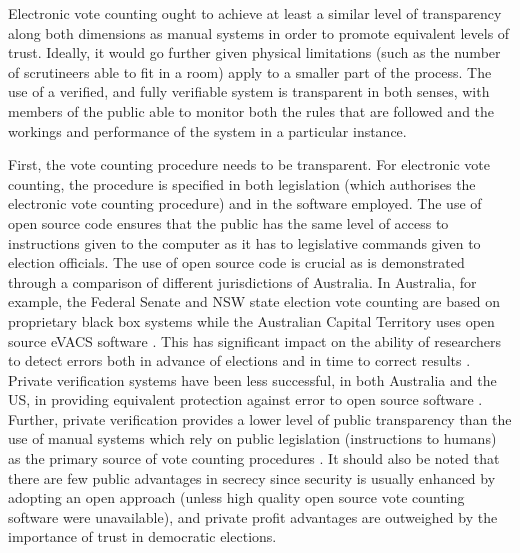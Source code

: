 Electronic vote counting ought to achieve at least a similar level
of transparency along both dimensions as manual systems in order to
promote equivalent levels of trust. Ideally, it would go further
given physical limitations (such as the number of scrutineers
able to fit in a room) apply to a smaller part of the process. The
use of a verified, and fully verifiable system is transparent in both senses, with members of
the public able to monitor both the rules that are followed
and the workings and performance of the system in a particular
instance. 

First, the vote counting procedure needs to be transparent. For
electronic vote counting, the procedure is specified in both
legislation (which authorises the electronic vote counting
procedure) and in the software employed. The use of open source code
ensures that the public has the same level of access to instructions
given to the computer as it has to legislative commands given to
election officials. The use of open source code is crucial as is
demonstrated through a comparison of different jurisdictions of
Australia. In Australia, for example, the Federal Senate and NSW
state election vote counting are based on proprietary black box
systems while the Australian Capital Territory uses open source
eVACS software
\cite{AEC:2013:LMM,Conway:2017:ANS,EA:2016:EVC}. This has
significant impact on the ability of researchers to detect errors
both in advance of elections and in time to correct results
\cite{Conway:2017:ANS}.
Private verification systems have been less successful, in both
Australia and the US, in providing equivalent protection against
error to open source software
\cite{Carrier:2012:VCT,Conway:2017:ANS}. Further, private
verification provides a lower level of public transparency than the
use of manual systems which rely on public legislation (instructions
to humans) as the primary source of vote counting procedures
\cite{Carrier:2012:VCT}. It
should also be noted that there are few public advantages in secrecy
since security is usually enhanced by adopting an open approach
(unless high quality open source vote counting software were
unavailable), and private profit advantages are outweighed by the
importance of trust in democratic elections. 

